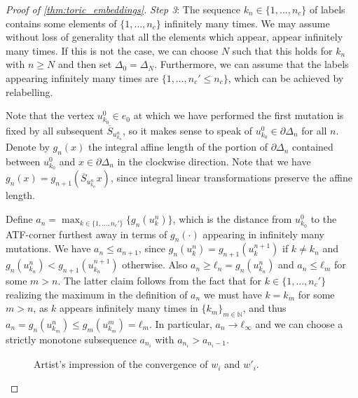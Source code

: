 \documentclass[AIF,Unicode,manuscript]{cedram}
\begin{document}
\begin{proof}[Proof of \cref{thm:toric_embeddings}]
  \emph{Step 3}: The sequence $k_n ∈ \{1,…,n_c\}$ of labels contains some elements of $\{1,…,n_c\}$ infinitely many times.
  We may assume without loss of generality that all the elements which appear, appear infinitely many times. If this is not the case, we can choose $N$ such that this holds for $k_n$ with $n≥N$ and then set $Δ_0=Δ_N$. Furthermore, we can assume that the labels appearing infinitely many times are $\{1,…,n_c'≤n_c\}$, which can be achieved by relabelling.

  Note that the vertex $u_{k_0}^0 ∈ e_0$ at which we have performed the first mutation is fixed by all subsequent $\overline{S}_{u_{k_n}^n}$, so it makes sense to speak of $u_{k_0}^0 ∈ ∂Δ_n$ for all $n$.
  Denote by $g_n(x)$ the integral affine length of the portion of $\partial \Delta_n$ contained between $u_{k_0}^0$ and $x ∈ ∂Δ_n$ in the clockwise direction.
Note that we have $g_n(x) = g_{n+1}(\overline{S}_{u_{k_n}^n}x)$, since integral linear transformations preserve the affine length.

  Define $a_n = \max_{k ∈\{1,…,n_c'\}} \{g_n(u_k^n)\}$, which is the distance from $u_{k_0}^0$ to the  ATF-corner furthest away in terms of $g_n(\cdot)$ appearing in infinitely many mutations.
We have $a_n ≤ a_{n+1}$, since $g_n(u_k^n) = g_{n+1}(u_k^{n+1})$ if $k ≠ k_n$ and $g_n(u_{k_n}^n) < g_{n+1}(u_{k_n}^{n+1})$ otherwise.
Also $a_n ≥ ℓ_n = g_n(u_{k_n}^n)$ and $a_n ≤ ℓ_m$ for some $m>n$.
The latter claim follows from the fact that for $k ∈ \{1, …, n_c'\}$ realizing the maximum in the definition of $a_n$ we must have $k = k_m$ for some $m>n$, as $k$ appears infinitely many times in $\{k_m\}_{m ∈ ℕ}$, and thus $a_n = g_n(u^n_{k_m}) ≤ g_m(u^m_{k_m}) = ℓ_m$.
In particular, $a_n → ℓ_∞$ and we can choose a strictly monotone subsequence $a_{n_i}$ with $a_{n_i} > a_{n_i-1}$.

  \begin{figure}
    \centering
    \caption{Artist's impression of the convergence of $w_i$ and $w'_i$.}
    \label{fig:stretch_wi}
  \end{figure}


\end{proof}
\end{document}
